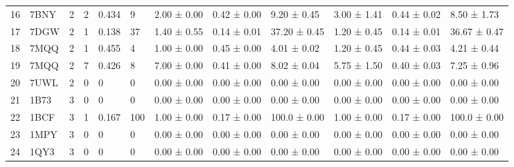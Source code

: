 \begin{table}[H]
{\begin{threeparttable}
\begin{tabular}{|p{0.3cm}|p{0.8cm}|p{0.2cm}|p{0.9cm}|p{0.9cm}|p{0.8cm}|p{1.6cm}|p{1.5cm}|p{1.7cm}|p{1.6cm}|p{1.5cm}|p{1.7cm}|}
16          & 7BNY            & 2                 & 2                         & 0.434            & 9                     & 2.00 ± 0.00           & 0.42 ± 0.00      & 9.20 ± 0.45                       & 3.00 ± 1.41           & 0.44 ± 0.02      & 8.50 ± 1.73                        \\
17          & 7DGW            & 2                 & 1                         & 0.138            & 37                    & 1.40 ± 0.55           & 0.14 ± 0.01      & 37.20 ± 0.45                      & 1.20 ± 0.45           & 0.14 ± 0.01      & 36.67 ± 0.47                       \\
18          & 7MQQ            & 2                 & 1                         & 0.455            & 4                     & 1.00 ± 0.00           & 0.45 ± 0.00      & 4.01 ± 0.02                       & 1.20 ± 0.45           & 0.44 ± 0.03      & 4.21 ± 0.44                        \\
19          & 7MQQ            & 2                 & 7                         & 0.426            & 8                     & 7.00 ± 0.00           & 0.41 ± 0.00      & 8.02 ± 0.04                       & 5.75 ± 1.50           & 0.40 ± 0.03      & 7.25 ± 0.96                        \\
20          & 7UWL            & 2                 & 0                         & 0                & 0                     & 0.00 ± 0.00           & 0.00 ± 0.00      & 0.00 ± 0.00                       & 0.00 ± 0.00           & 0.00 ± 0.00      & 0.00 ± 0.00                        \\ 
\hline \hline
21          & 1B73            & 3                 & 0                         & 0                & 0                     & 0.00 ± 0.00           & 0.00 ± 0.00      & 0.00 ± 0.00                       & 0.00 ± 0.00           & 0.00 ± 0.00      & 0.00 ± 0.00                        \\
22          & 1BCF            & 3                 & 1                         & 0.167            & 100                   & 1.00 ± 0.00           & 0.17 ± 0.00      & 100.0 ± 0.00 & 1.00 ± 0.00 & 0.17 ± 0.00 & 100.0 ± 0.00 \\
23          & 1MPY            & 3                 & 0                         & 0                & 0                     & 0.00 ± 0.00           & 0.00 ± 0.00      & 0.00 ± 0.00                       & 0.00 ± 0.00           & 0.00 ± 0.00      & 0.00 ± 0.00                        \\
24          & 1QY3            & 3                 & 0                         & 0                & 0                     & 0.00 ± 0.00           & 0.00 ± 0.00      & 0.00 ± 0.00                       & 0.00 ± 0.00           & 0.00 ± 0.00      & 0.00 ± 0.00                        \\

\end{tabular}
\end{threeparttable}}
\end{table}
